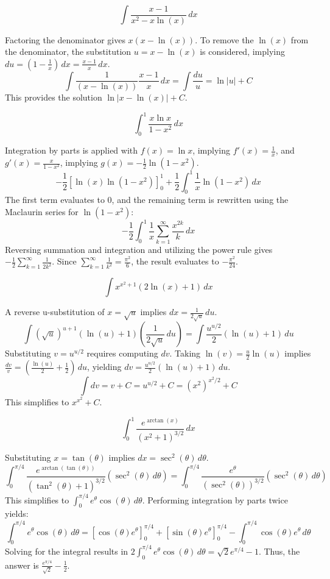 \begin{questions}
    \question \[ \int\frac{x-1}{x^{2}-x\ln(x)} \,dx \]
    \begin{solution}
        Factoring the denominator gives $x(x-\ln(x))$.
        To remove the $\ln(x)$ from the denominator, the substitution $u=x-\ln(x)$ is considered, implying $du=\left(1-\frac{1}{x}\right) \,dx = \frac{x-1}{x} \,dx$.
        \[ \int\frac{1}{(x-\ln(x))}\frac{x-1}{x} \,dx = \int\frac{du}{u} = \ln|u|+C \]
        This provides the solution $\ln|x-\ln(x)|+C$.
    \end{solution}

    \question \[ \int_{0}^{1}\frac{x\ln x}{1-x^{2}} \,dx \]
    \begin{solution}
        Integration by parts is applied with $f(x)=\ln x$, implying $f'(x)=\frac{1}{x}$, and $g'(x)=\frac{x}{1-x^{2}}$, implying $g(x)=-\frac{1}{2}\ln(1-x^{2})$.
        \[ -\frac{1}{2}\left[ \ln(x)\ln(1-x^{2}) \right]_{0}^{1} + \frac{1}{2}\int_{0}^{1}\frac{1}{x}\ln(1-x^{2}) \,dx \]
        The first term evaluates to $0$, and the remaining term is rewritten using the Maclaurin series for $\ln(1-x^{2})$:
        \[ -\frac{1}{2}\int_{0}^{1}\frac{1}{x}\sum_{k=1}^{\infty}\frac{x^{2k}}{k} \,dx \]
        Reversing summation and integration and utilizing the power rule gives $-\frac{1}{2}\sum_{k=1}^{\infty}\frac{1}{2k^{2}}$. Since $\sum_{k=1}^{\infty}\frac{1}{k^{2}}=\frac{\pi^{2}}{6}$, the result evaluates to $-\frac{\pi^{2}}{24}$.
    \end{solution}

    \question \[ \int x^{x^{2}+1}(2\ln(x)+1) \,dx \]
    \begin{solution}
        A reverse u-substitution of $x=\sqrt{u}$ implies $dx=\frac{1}{2\sqrt{u}} \,du$.
        \[ \int(\sqrt{u})^{u+1}(\ln(u)+1)\left(\frac{1}{2\sqrt{u}} \,du\right) = \int\frac{u^{u/2}}{2}(\ln(u)+1) \,du \]
        Substituting $v=u^{u/2}$ requires computing $dv$. Taking $\ln(v)=\frac{u}{2}\ln(u)$ implies $\frac{dv}{v}=\left(\frac{\ln(u)}{2}+\frac{1}{2}\right) \,du$, yielding $dv=\frac{u^{u/2}}{2}(\ln(u)+1) \,du$.
        \[ \int dv = v+C = u^{u/2}+C = (x^{2})^{x^{2}/2}+C \]
        This simplifies to $x^{x^{2}}+C$.
    \end{solution}

    \question \[ \int_{0}^{1}\frac{e^{\arctan(x)}}{(x^{2}+1)^{3/2}} \,dx \]
    \begin{solution}
        Substituting $x=\tan(\theta)$ implies $dx=\sec^{2}(\theta) \,d\theta$.
        \[ \int_{0}^{\pi/4}\frac{e^{\arctan(\tan(\theta))}}{(\tan^{2}(\theta)+1)^{3/2}}(\sec^{2}(\theta) \,d\theta) = \int_{0}^{\pi/4}\frac{e^{\theta}}{(\sec^{2}(\theta))^{3/2}}(\sec^{2}(\theta) \,d\theta) \]
        This simplifies to $\int_{0}^{\pi/4}e^{\theta}\cos(\theta) \,d\theta$. Performing integration by parts twice yields:
        \[ \int_{0}^{\pi/4}e^{\theta}\cos(\theta) \,d\theta = \left[ \cos(\theta)e^{\theta} \right]_{0}^{\pi/4} + \left[ \sin(\theta)e^{\theta} \right]_{0}^{\pi/4} - \int_{0}^{\pi/4}\cos(\theta)e^{\theta} \,d\theta \]
        Solving for the integral results in $2\int_{0}^{\pi/4}e^{\theta}\cos(\theta) \,d\theta = \sqrt{2}e^{\pi/4}-1$. Thus, the answer is $\frac{e^{\pi/4}}{\sqrt{2}}-\frac{1}{2}$.
    \end{solution}


\end{questions}
